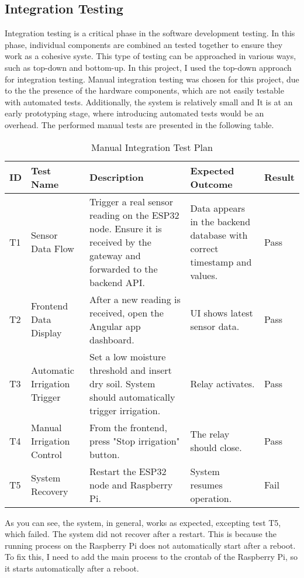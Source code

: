 \subsection {Integration Testing}
Integration testing is a critical phase in the software development testing. In this phase, individual components are combined an tested 
together to ensure they work as a cohesive syste. This type of testing can be approached in various ways, such as top-down and bottom-up.
In this project, I used the top-down approach for integration testing. Manual integration testing was chosen for this project, due to the 
the presence of the hardware components, which are not easily testable with automated tests. Additionally, the system is relatively small and It
is at an early prototyping stage, where introducing automated tests would be an overhead.
The performed manual tests are presented in the following table.
\begin{table}[H]
\centering
\begin{tabular}{|p{1cm}|p{4cm}|p{6cm}|p{3cm}|p{2cm}|}
\hline
\textbf{ID} & \textbf{Test Name} & \textbf{Description} & \textbf{Expected Outcome} & \textbf{Result} \\
\hline
T1 & Sensor Data Flow & Trigger a real sensor reading on the ESP32 node. Ensure it is received by the gateway and forwarded to the backend API. & Data appears in the backend database with correct timestamp and values. & Pass \\
\hline
T2 & Frontend Data Display & After a new reading is received, open the Angular app dashboard. & UI shows latest sensor data. & Pass \\
\hline
T3 & Automatic Irrigation Trigger & Set a low moisture threshold and insert dry soil. System should automatically trigger irrigation. & Relay activates. & Pass \\
\hline
T4 & Manual Irrigation Control & From the frontend, press "Stop irrigation" button. & The relay should close. & Pass \\
\hline
T5 & System Recovery & Restart the ESP32 node and Raspberry Pi. & System resumes operation. & Fail \\
\hline
\end{tabular}
\caption{Manual Integration Test Plan}
\label{tab:manual_integration_test_plan}
\end{table}

As you can see, the system, in general, works as expected, excepting test T5, which failed. The system did not recover after a restart.
This is because the running process on the Raspberry Pi does not automatically start after a reboot. To fix this,
I need to add the main process to the crontab of the Raspberry Pi, so it starts automatically after a reboot.

